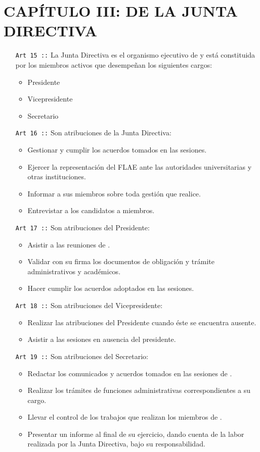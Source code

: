 \section{CAPÍTULO III: DE LA JUNTA DIRECTIVA}
\begin{itemize}
  \item [\texttt{Art 15 ::}] La Junta Directiva es el organismo ejecutivo de \flae y está constituida por los
  miembros activos que desempeñan los siguientes cargos:
  \begin{itemize}
    \item Presidente
    \item Vicepresidente
    \item Secretario
  \end{itemize}
  \item [\texttt{Art 16 ::}] Son atribuciones de la Junta Directiva:
  \begin{itemize}
    \item Gestionar y cumplir los acuerdos tomados en las sesiones.
    \item Ejercer la representación del FLAE ante las autoridades universitarias y otras instituciones.
    \item Informar a sus miembros sobre toda gestión que realice.
    \item Entrevistar a los candidatos a miembros.
  \end{itemize}
  \item [\texttt{Art 17 ::}]  Son atribuciones del Presidente:
  \begin{itemize}
    \item Asistir a las reuniones de \flae.
    \item Validar con su firma los documentos de obligación y trámite administrativos y académicos.
    \item Hacer cumplir los acuerdos adoptados en las sesiones.
  \end{itemize}
  \item [\texttt{Art 18 ::}] Son atribuciones del Vicepresidente:
  \begin{itemize}
    \item Realizar las atribuciones del Presidente cuando éste se encuentra ausente.
    \item Asistir a las sesiones en ausencia del presidente.
  \end{itemize}
  \item [\texttt{Art 19 ::}] Son atribuciones del Secretario:
  \begin{itemize}
    \item Redactar los comunicados y acuerdos tomados en las sesiones de \flae.
    \item Realizar los trámites de funciones administrativas correspondientes a su cargo.
    \item Llevar el control de los trabajos que realizan los miembros de \flae.
    \item Presentar un informe al final de su ejercicio, dando cuenta de la labor realizada por la Junta Directiva, bajo su responsabilidad.
  \end{itemize}

\end{itemize}


